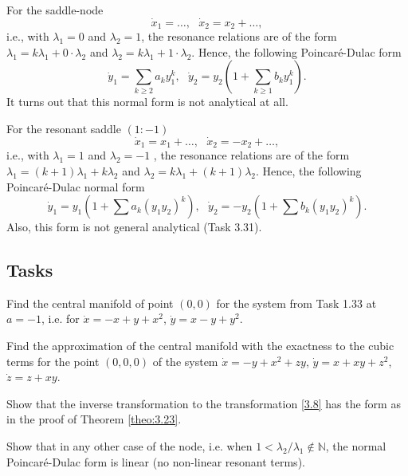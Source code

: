 \begin{example}
	For the saddle-node
	$$
	\dot{x}_{1}=\ldots ,\text{ \ \ }\dot{x}_{2}=x_{2}+\ldots ,
	$$
	i.e., with $\lambda _{1}=0$ and $\lambda _{2}=1$, the resonance relations are of the form $\lambda _{1}=k\lambda _{1}+0\cdot \lambda _{2}$ and $\lambda
	_{2}=k\lambda _{1}+1\cdot \lambda _{2}$. Hence, the following Poincaré-Dulac form
	$$
	\dot{y}_{1}=\sum_{k\geq 2}a_{k}y_{1}^{k},\text{ \ \ }\dot{y}_{2}=y_{2}\left(
	1+\sum_{k\geq 1}b_{k}y_{1}^{k}\right) .
	$$
	It turns out that this normal form is not analytical at all.
\end{example}

\begin{example}\label{example:3.26}
	For the resonant saddle $(1: -1)$
	$$
	\dot{x}_{1}=x_{1}+\ldots ,\text{ \ \ }\dot{x}_{2}=-x_{2}+\ldots ,
	$$
	i.e., with $\lambda _{1}=1$ and $\lambda _{2}=-1$ , the resonance relations are of the form $\lambda _{1}=(k+1)\lambda _{1}+k\lambda _{2}$ and $\lambda
	_{2}=k\lambda _{1}+(k+1)\lambda _{2}.$ Hence, the following Poincaré-Dulac normal form
	$$
	\dot{y}_{1}=y_{1}\left( 1+\sum a_{k}\left( y_{1}y_{2}\right) ^{k}\right) ,\text{ \ \ }\dot{y}_{2}=-y_{2}\left( 1+\sum b_{k}\left( y_{1}y_{2}\right)
	^{k}\right).
	$$
	Also, this form is not general analytical (Task 3.31).
\end{example}

\subsection*{Tasks}
\begin{task}
	Find the central manifold of point $(0, 0)$ for the system from Task 1.33 at $a = -1$, i.e. for $\dot{x}=-x+y+x^{2}$, $\dot{y}=x-y+y^{2}$.
\end{task}

\begin{task}
	Find the approximation of the central manifold with the exactness to the cubic terms for the point $(0, 0, 0)$ of the system $\dot{x}=-y+x^{2}+zy$, $\dot{y} = x+xy+z^{2}$, $\dot{z}=z+xy$.
\end{task}

\begin{task}
	Show that the inverse transformation to the transformation \eqref{3.8} has the form as in the proof of Theorem \ref{theo:3.23}.
\end{task}

\begin{task}
	Show that in any other case of the node, i.e. when $1<\lambda _{2}/\lambda _{1}\not\in \mathbb{N}$, the normal Poincaré-Dulac form is linear (no non-linear resonant terms).
\end{task}

